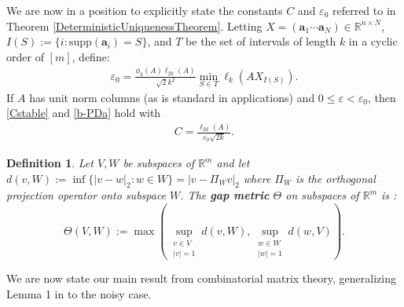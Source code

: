 \documentclass[journal, onecolumn]{IEEEtran}
\newtheorem{definition}{Definition}
\begin{document}
We are now in a position to explicitly state the constants $C$ and $\varepsilon_0$ referred to in Theorem \ref{DeterministicUniquenessTheorem}. Letting $X  = (\mathbf{a}_1 \cdots \mathbf{a}_N) \in \mathbb{R}^{n \times N}$, $I(S) := \{i : \text{supp}(\mathbf{a}_i) = S\}$, and $T$ be the set of intervals of length $k$ in a cyclic order of $[m]$, define:
\begin{align}\label{epsilon0}
\varepsilon_0 = \frac{ \phi_k(A) \ell_{2k}(A) }{\sqrt{2}k^2} \min_{S \in T} \ell_k(AX_{I(S)}).
\end{align}
If $A$ has unit norm columns (as is standard in applications) and $0 \leq \varepsilon < \varepsilon_0$, then \eqref{Cstable} and \eqref{b-PDa} hold with
\begin{align}\label{Cdef}
C = \frac{\ell_{2k}(A)}{ \varepsilon_0 \sqrt{2k}}.
\end{align}

\begin{definition}\label{GapMetricDef}
Let $V, W$ be subspaces of $\mathbb{R}^m$ and let $d(v,W) := \inf\{|v-w|_2: w \in W\} = |v - \Pi_W v|_2$ where $\Pi_W$ is the orthogonal projection operator onto subspace $W$. The \textbf{gap metric} $\Theta$ on subspaces of $\mathbb{R}^{m}$ is \cite{TheoryOfLinearOperatorsPage69}:
\begin{equation}\label{SubspaceMetric}
\Theta(V,W) := \max\left( \sup_{\substack{v \in V \\ |v| = 1}} d(v,W), \sup_{\substack{w \in W \\ |w| = 1}} d(w,V) \right).
\end{equation}
\end{definition}

We are now state our main result from combinatorial matrix theory, generalizing Lemma 1 in \cite{Hillar15} to the noisy case.

\end{document}
